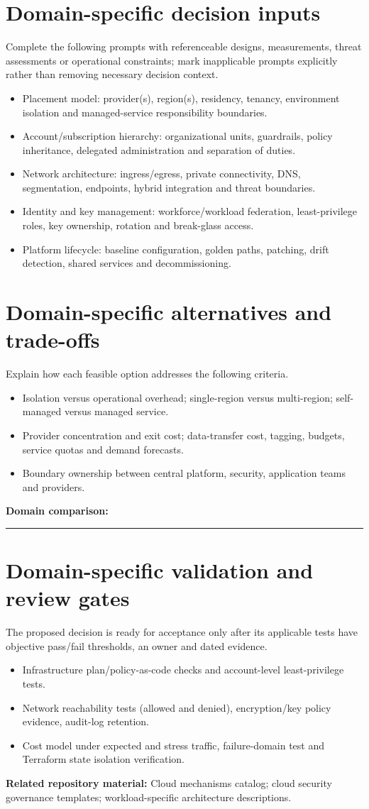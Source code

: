 \documentclass[11pt,letterpaper]{article}
\newcommand{\BlankResponse}{\rule[-0.4em]{0pt}{2em}\rule{0.65\linewidth}{0.4pt}}
\begin{document}
\section{Domain-specific decision inputs}
Complete the following prompts with referenceable designs, measurements,
threat assessments or operational constraints; mark inapplicable prompts
explicitly rather than removing necessary decision context.
\begin{itemize}
\item Placement model: provider(s), region(s), residency, tenancy, environment isolation and managed-service responsibility boundaries.
\item Account/subscription hierarchy: organizational units, guardrails, policy inheritance, delegated administration and separation of duties.
\item Network architecture: ingress/egress, private connectivity, DNS, segmentation, endpoints, hybrid integration and threat boundaries.
\item Identity and key management: workforce/workload federation, least-privilege roles, key ownership, rotation and break-glass access.
\item Platform lifecycle: baseline configuration, golden paths, patching, drift detection, shared services and decommissioning.
\end{itemize}
\section{Domain-specific alternatives and trade-offs}
Explain how each feasible option addresses the following criteria.
\begin{itemize}
\item Isolation versus operational overhead; single-region versus multi-region; self-managed versus managed service.
\item Provider concentration and exit cost; data-transfer cost, tagging, budgets, service quotas and demand forecasts.
\item Boundary ownership between central platform, security, application teams and providers.
\end{itemize}
\noindent\textbf{Domain comparison:} \BlankResponse
\section{Domain-specific validation and review gates}
The proposed decision is ready for acceptance only after its applicable
tests have objective pass/fail thresholds, an owner and dated evidence.
\begin{itemize}
\item Infrastructure plan/policy-as-code checks and account-level least-privilege tests.
\item Network reachability tests (allowed and denied), encryption/key policy evidence, audit-log retention.
\item Cost model under expected and stress traffic, failure-domain test and Terraform state isolation verification.
\end{itemize}
\noindent\textbf{Related repository material:} Cloud mechanisms catalog; cloud security governance templates; workload-specific architecture descriptions.
\end{document}
